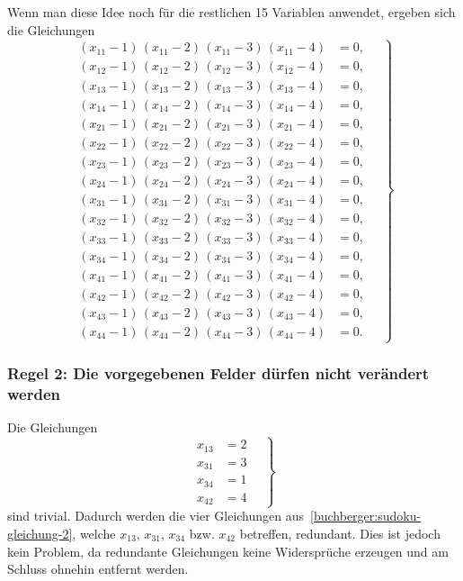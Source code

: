 Wenn man diese Idee noch für die restlichen 15 Variablen anwendet, ergeben sich die Gleichungen
\begin{equation}
\left.
\begin{aligned}
  (x_{11} - 1)\,(x_{11} - 2)\,(x_{11} - 3)\,(x_{11} - 4) &= 0,\\
  (x_{12} - 1)\,(x_{12} - 2)\,(x_{12} - 3)\,(x_{12} - 4) &= 0,\\
  (x_{13} - 1)\,(x_{13} - 2)\,(x_{13} - 3)\,(x_{13} - 4) &= 0,\\
  (x_{14} - 1)\,(x_{14} - 2)\,(x_{14} - 3)\,(x_{14} - 4) &= 0,\\
  (x_{21} - 1)\,(x_{21} - 2)\,(x_{21} - 3)\,(x_{21} - 4) &= 0,\\
  (x_{22} - 1)\,(x_{22} - 2)\,(x_{22} - 3)\,(x_{22} - 4) &= 0,\\
  (x_{23} - 1)\,(x_{23} - 2)\,(x_{23} - 3)\,(x_{23} - 4) &= 0,\\
  (x_{24} - 1)\,(x_{24} - 2)\,(x_{24} - 3)\,(x_{24} - 4) &= 0,\\
  (x_{31} - 1)\,(x_{31} - 2)\,(x_{31} - 3)\,(x_{31} - 4) &= 0,\\
  (x_{32} - 1)\,(x_{32} - 2)\,(x_{32} - 3)\,(x_{32} - 4) &= 0,\\
  (x_{33} - 1)\,(x_{33} - 2)\,(x_{33} - 3)\,(x_{33} - 4) &= 0,\\
  (x_{34} - 1)\,(x_{34} - 2)\,(x_{34} - 3)\,(x_{34} - 4) &= 0,\\
  (x_{41} - 1)\,(x_{41} - 2)\,(x_{41} - 3)\,(x_{41} - 4) &= 0,\\
  (x_{42} - 1)\,(x_{42} - 2)\,(x_{42} - 3)\,(x_{42} - 4) &= 0,\\
  (x_{43} - 1)\,(x_{43} - 2)\,(x_{43} - 3)\,(x_{43} - 4) &= 0,\\
  (x_{44} - 1)\,(x_{44} - 2)\,(x_{44} - 3)\,(x_{44} - 4) &= 0.
\end{aligned}
\quad %
\right\}
\label{buchberger:sudoku-gleichung-2}
\end{equation}

\subsubsection{Regel 2: Die vorgegebenen Felder dürfen nicht verändert werden}
Die Gleichungen
\begin{equation}
\left.
  \begin{aligned}
  x_{13} &= 2 \\
  x_{31} &= 3 \\
  x_{34} &= 1 \\
  x_{42} &= 4
  \end{aligned}
\quad %
\right\}
\label{buchberger:sudoku-gleichung-3}
\end{equation}
sind trivial.
Dadurch werden die vier Gleichungen aus~\eqref{buchberger:sudoku-gleichung-2}, welche $x_{13}$, $x_{31}$, $x_{34}$ bzw. $x_{42}$ betreffen, redundant.
Dies ist jedoch kein Problem, da redundante Gleichungen keine Widersprüche erzeugen und am Schluss ohnehin entfernt werden.

